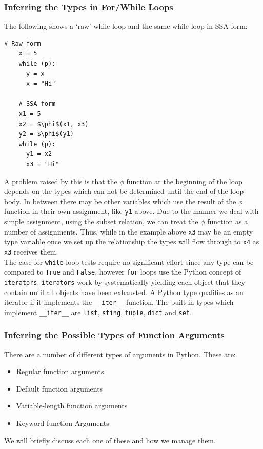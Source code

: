 \documentclass[12pt, titlepage]{article}
\begin{document}
\subsubsection{Inferring the Types in For/While Loops}
The following shows a `raw' while loop and the same while loop in SSA form:
\begin{lstlisting}[mathescape]
    # Raw form
    x = 5
    while (p):
      y = x
      x = "Hi"
	
    # SSA form
    x1 = 5
    x2 = $\phi$(x1, x3)
    y2 = $\phi$(y1)
    while (p):
      y1 = x2
      x3 = "Hi"
\end{lstlisting}
A problem raised by this is that the $\phi$ function at the beginning of the loop depends on the types which can not be determined until the end of the loop body. In between there may be other variables which use the result of the $\phi$ function in their own assignment, like \texttt{y1} above. Due to the manner we deal with simple assignment, using the subset relation, we can treat the $\phi$ function as a number of assignments. Thus, while in the example above \texttt{x3} may be an empty type variable once we set up the relationship the types will flow through to \texttt{x4} as \texttt{x3} receives them. \\
\indent The case for \texttt{while} loop tests require no significant effort since any type can be compared to \texttt{True} and \texttt{False}, however \texttt{for} loops use the Python concept of \texttt{iterators}. \texttt{iterators} work by systematically yielding each object that they contain until all objects have been exhausted.
A Python type qualifies as an iterator if it implements the \texttt{\_\_iter\_\_} function. The built-in types which implement \texttt{\_\_iter\_\_} are \texttt{list}, \texttt{sting}, \texttt{tuple}, \texttt{dict} and \texttt{set}.


\subsubsection{Inferring the Possible Types of Function Arguments}
There are a number of different types of arguments in Python. These are:
\begin{itemize}
	\item Regular function arguments
	\item Default function arguments
	\item Variable-length function arguments
	\item Keyword function Arguments
\end{itemize}
We will briefly discuss each one of these and how we manage them.
\end{document}
